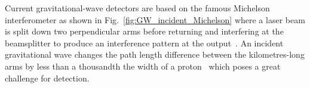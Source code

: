 Current gravitational-wave detectors are based on the famous Michelson interferometer as shown in Fig.~\ref{fig:GW_incident_Michelson} where a laser beam is split down two perpendicular arms before returning and interfering at the beamsplitter to produce an interference pattern at the output~\cite{}. 
An incident gravitational wave changes the path length difference between the kilometres-long arms by less than a thousandth the width of a proton~\cite{} which poses a great challenge for detection. %
